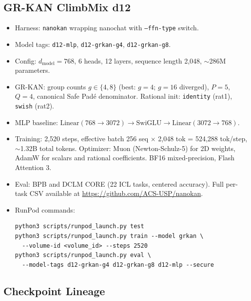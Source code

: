 \documentclass{article}
\begin{document}
\subsection{GR-KAN ClimbMix d12}

\begin{itemize}
  \item Harness: \texttt{nanokan} wrapping nanochat with \texttt{--ffn-type} switch.
  \item Model tags: \texttt{d12-mlp}, \texttt{d12-grkan-g4}, \texttt{d12-grkan-g8}.
  \item Config: $d_\text{model}=768$, 6 heads, 12 layers, sequence length 2,048,
    $\sim$286M parameters.
  \item GR-KAN: group counts $g \in \{4, 8\}$ (best: $g=4$; $g=16$ diverged), $P=5$, $Q=4$, canonical Safe Pad\'{e} denominator.
    Rational init: \texttt{identity} (rat1), \texttt{swish} (rat2).
  \item MLP baseline: $\text{Linear}(768{\to}3072) \to \text{SwiGLU} \to \text{Linear}(3072{\to}768)$.
  \item Training: 2,520 steps, effective batch 256 seq $\times$ 2,048 tok = 524,288 tok/step,
    $\sim$1.32B total tokens. Optimizer: Muon (Newton-Schulz-5)
    for 2D weights, AdamW for scalars and rational coefficients.
    BF16 mixed-precision, Flash Attention 3.
  \item Eval: BPB and DCLM CORE (22 ICL tasks, centered accuracy).
    Full per-task CSV available at \url{https://github.com/ACS-USP/nanokan}.
  \item RunPod commands:
\begin{verbatim}
python3 scripts/runpod_launch.py test
python3 scripts/runpod_launch.py train --model grkan \
  --volume-id <volume_id> --steps 2520
python3 scripts/runpod_launch.py eval \
  --model-tags d12-grkan-g4 d12-grkan-g8 d12-mlp --secure
\end{verbatim}
\end{itemize}

\subsection{Checkpoint Lineage}
\end{document}

